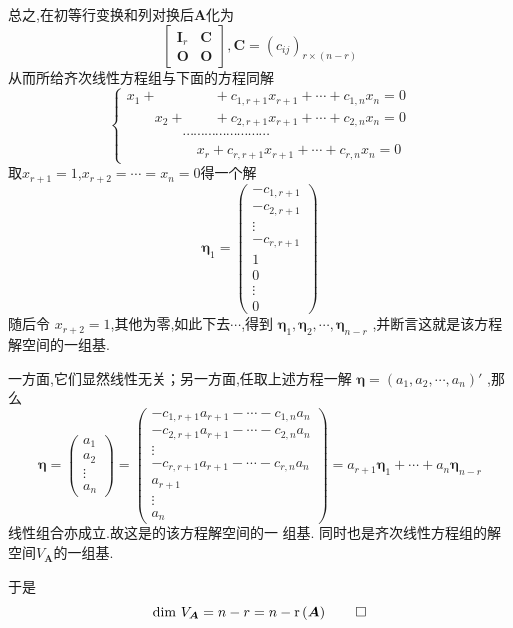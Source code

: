 \begin{formal}
\begin{Proof}
总之,在初等行变换和列对换后$\bm{A}$化为
\[
\begin{bmatrix}
    \bm{I}_r&\bm{C}\\\bm{O}&\bm{O}
\end{bmatrix}
,\bm{C}=\left(c_{ij}\right)_{r\times \left(n-r\right)}
\]
从而所给齐次线性方程组与下面的方程同解
\[
\begin{cases*}
x_1+\qquad \qquad +c_{1,r+1}x_{r+1}+\cdots+c_{1,n}x_n=0\\
\qquad x_2+\qquad +c_{2,r+1}x_{r+1}+\cdots+c_{2,n}x_n=0\\
\qquad\qquad\cdots\cdots\cdots\cdots\cdots\cdots\cdots\cdots\\
\qquad\qquad \quad x_r+c_{r,r+1}x_{r+1}+\cdots+c_{r,n}x_n=0
\end{cases*}
\]
取$x_{r+1}=1$,$x_{r+2}=\cdots=x_n=0$得一个解
\[
\bm{\eta}_1=\begin{pmatrix}
    -c_{1,r+1}\\
    -c_{2,r+1}\\
    \vdots\\
    -c_{r,r+1}\\
    1\\
    0\\
    \vdots\\
    0
\end{pmatrix}
\]
随后令
$x_{r+2}=1$,其他为零,如此下去$\cdots$,得到
$\bm{\eta}_1,\bm{\eta}_2,\cdots,\bm{\eta}_{n-r}
$
,并断言这就是该方程解空间的一组基.

一方面,它们显然线性无关；另一方面,任取上述方程一解
$\bm{\eta}=\left(a_1,a_2,\cdots,a_n\right)
'$
,那么
\[
\bm{\eta}=\begin{pmatrix}
    a_1\\a_2\\\vdots\\a_n
\end{pmatrix}
=\begin{pmatrix}
    -c_{1,r+1}a_{r+1}-\cdots-c_{1,n}a_n\\
    -c_{2,r+1}a_{r+1}-\cdots-c_{2,n}a_n\\
    \vdots\\
    -c_{r,r+1}a_{r+1}-\cdots-c_{r,n}a_n\\
    a_{r+1}\\
    \vdots\\
    a_n
\end{pmatrix}=a_{r+1}\bm{\eta}_1+\cdots+a_n\bm{\eta}
_{n-r}
\]
线性组合亦成立.故这是的该方程解空间的一
组基.
同时也是齐次线性方程组的解空间$V_{\bm{A}}$的一组基.

于是
\[
\dim\,V_{\bm{A}}=n-r=n-\mathrm{r}\left(\bm{A}
\right)
\qedhere
\]
\end{Proof}
\end{formal}
